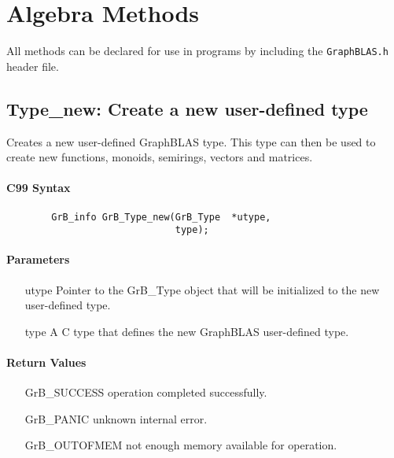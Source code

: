 \section{Algebra Methods}
\label{Sec:AlgebraMethods}

All methods can be declared for use in programs by including the {\tt GraphBLAS.h} header file.


\subsection{{\sf Type\_new}: Create a new user-defined type}

Creates a new user-defined GraphBLAS type. This type can then be used to create new
functions, monoids, semirings, vectors and matrices.

\paragraph{C99 Syntax}

\begin{verbatim}
        GrB_info GrB_Type_new(GrB_Type	*utype,
                              type);
\end{verbatim}

\paragraph{Parameters}

\begin{itemize}[leftmargin=1.1in]
	\item[{\sf utype}] 	Pointer to the {\sf GrB\_Type} object that will be initialized to the new user-defined type.
	\item[{\sf type}]	A C type that defines the new GraphBLAS user-defined type.
\end{itemize}

\paragraph{Return Values}

\begin{itemize}[leftmargin=2.1in]
\item[{\sf GrB\_SUCCESS}]           operation completed successfully.
\item[{\sf GrB\_PANIC}]             unknown internal error.
\item[{\sf GrB\_OUTOFMEM}]          not enough memory available for operation.
\end{itemize}

